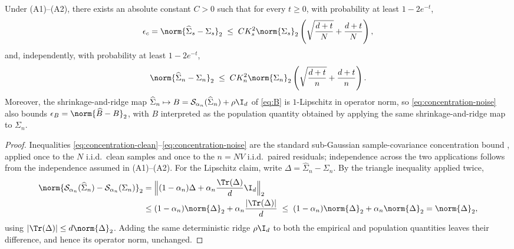 \begin{theorem}
\label{thm:sampleconcentration}
Under (A1)--(A2), there exists an absolute constant $C>0$ such that for
every $t\ge0$, with probability at least $1-2e^{-t}$,
\begin{equation}
 \epsilon_c=\norm{\widehat\Sigma_s-\Sigma_s}_2
 \;\le\;
 CK_s^2\norm{\Sigma_s}_2
 \left(\sqrt{\frac{d+t}{N}}+\frac{d+t}{N}\right),
 \label{eq:concentration-clean}
\end{equation}
and, independently, with probability at least $1-2e^{-t}$,
\begin{equation}
 \norm{\widehat\Sigma_n-\Sigma_n}_2
 \;\le\;
 CK_n^2\norm{\Sigma_n}_2
 \left(\sqrt{\frac{d+t}{n}}+\frac{d+t}{n}\right).
 \label{eq:concentration-noise}
\end{equation}
Moreover, the shrinkage-and-ridge map $\widehat\Sigma_n\mapsto B=
\mathcal S_{\alpha_n}(\widehat\Sigma_n)+\rho\I_d$ of \cref{eq:B} is
$1$-Lipschitz in operator norm, so \cref{eq:concentration-noise} also
bounds $\epsilon_B=\norm{\widehat B-B}_2$, with $B$ interpreted as the
population quantity obtained by applying the same shrinkage-and-ridge map
to $\Sigma_n$.
\end{theorem}
\begin{proof}
Inequalities \eqref{eq:concentration-clean}--\eqref{eq:concentration-noise}
are the standard sub-Gaussian sample-covariance concentration bound
\citep[Theorem~4.7.1]{vershynin2018high}, applied once to the $N$ i.i.d.\
clean samples and once to the $n=NV$ i.i.d.\ paired residuals; independence
across the two applications follows from the independence assumed in
(A1)--(A2). For the Lipschitz claim, write $\Delta=\widehat\Sigma_n-
\Sigma_n$. By the triangle inequality applied twice,
\begin{align*}
 \norm{\mathcal S_{\alpha_n}(\widehat\Sigma_n)-\mathcal S_{\alpha_n}(\Sigma_n)}_2
 &=\Big\|(1-\alpha_n)\Delta
 +\alpha_n\frac{\Tr(\Delta)}{d}\I_d\Big\|_2\\
 &\le(1-\alpha_n)\norm{\Delta}_2+\alpha_n\frac{|\Tr(\Delta)|}{d}
 \;\le\;(1-\alpha_n)\norm{\Delta}_2+\alpha_n\norm{\Delta}_2
 =\norm{\Delta}_2,
\end{align*}
using $|\Tr(\Delta)|\le d\norm{\Delta}_2$. Adding the same deterministic
ridge $\rho\I_d$ to both the empirical and population quantities leaves
their difference, and hence its operator norm, unchanged.
\end{proof}

